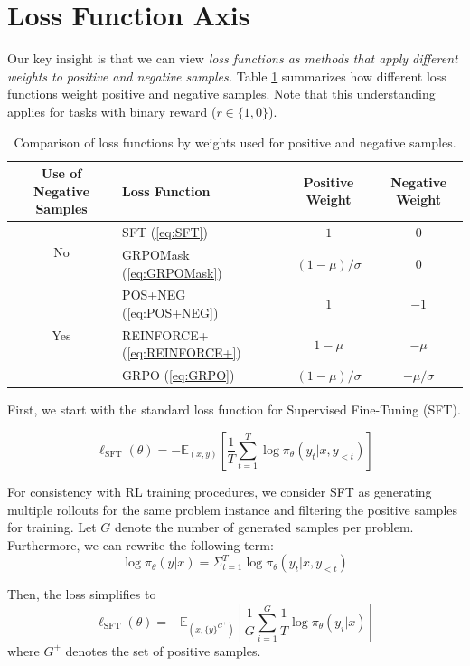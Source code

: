 \documentclass[12pt]{cmuthesis}
\begin{document}
\section{Loss Function Axis}
Our key insight is that we can view \emph{loss functions as methods that apply different weights to positive and negative samples.} Table \ref{tab:loss_function_comparison} summarizes how different loss functions weight positive and negative samples. Note that this understanding applies for tasks with binary reward ($r \in \{1, 0\}$).

\begin{table}[h!]
\centering
\begin{tabular}{clcc}
\toprule
\textbf{Use of Negative Samples} & \textbf{Loss Function} & \textbf{Positive Weight} & \textbf{Negative Weight} \\
\midrule
\multirow{2}{*}{No} & SFT (\ref{eq:SFT}) & $1$ & $0$ \\
& GRPOMask (\ref{eq:GRPOMask}) & $(1 - \mu)/\sigma$ & $0$ \\
\midrule 
\multirow{3}{*}{Yes} & POS+NEG (\ref{eq:POS+NEG}) & $1$ & $-1$ \\
& REINFORCE+ (\ref{eq:REINFORCE+}) & $1 - \mu$ & $- \mu$ \\
& GRPO (\ref{eq:GRPO}) & $(1 - \mu)/\sigma$ & $-\mu/\sigma$ \\
\bottomrule
\end{tabular}
\label{tab:loss_function_comparison}
\vspace{0.5em}
\caption{Comparison of loss functions by weights used for positive and negative samples.}
\end{table}

First, we start with the standard loss function for Supervised Fine-Tuning (SFT).

\[ \ell_{\text{SFT}}(\theta) = - \mathbb{E}_{(x, y)} \left[ \frac{1}{T} \sum_{t = 1}^T \log \pi_\theta(y_t \vert x, y_{< t}) \right] \]

For consistency with RL training procedures, we consider SFT as generating multiple rollouts for the same problem instance and filtering the positive samples for training. Let $G$ denote the number of generated samples per problem. Furthermore, we can rewrite the following term:
\[
    \log \pi_\theta(y \vert x) = \Sigma_{t = 1}^T \log \pi_\theta(y_t \vert x, y_{< t})
\]

Then, the loss simplifies to 
\[
    \ell_{\text{SFT}}(\theta) = - \mathbb{E}_{(x, \{y\}^{G^+})} \left[ \frac{1}{G} \sum_{i = 1}^G \frac{1}{T} \log \pi_\theta(y_i \vert x) \right]
\]
where $G^+$ denotes the set of positive samples.
\end{document}
